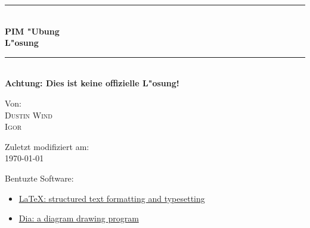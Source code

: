 

\newcommand{\TitleHRule}{\rule{\linewidth}{0.5mm}}

\begin{titlepage}
    \begin{center}

    \TitleHRule \\[0.4cm]
    { \huge \bfseries PIM "Ubung\\L"osung\\[0.4cm] }
    \TitleHRule \\[1.5cm]

    \textbf{Achtung: Dies ist keine offizielle L"osung!}

    \vfill
    Von:\\
    \textsc{Dustin Wind}\\
    \textsc{Igor}


   \vfill
    Zuletzt modifiziert am:\\
    {\large \today}\\
    \end{center}
    \bigskip

    {\small
    Bentuzte Software:
    \begin{itemize}
        \item \href{http://www.latex-project.org}{\LaTeX{}: structured text formatting and typesetting}
        \item \href{https://wiki.gnome.org/Apps/Dia/}{Dia: a diagram drawing program}
    \end{itemize}
    }

\end{titlepage}

